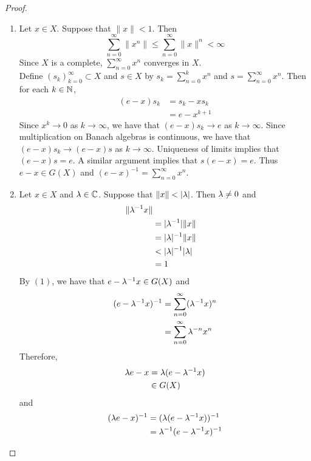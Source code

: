 \documentclass{book}
\begin{document}
\begin{proof}\
	\begin{enumerate}
		\item Let $x \in X$. Suppose that $\|x \|< 1$. Then $$\sum_{n=0}^{\infty} \|x^n \| \leq \sum_{n=0}^{\infty} \|x \|^{n} < \infty$$ Since $X$ is a complete, $\sum\limits_{n=0}^{\infty}x^n$ converges in $X$.\\
		Define $(s_k)_{k=0}^{\infty} \subset X$ and $s \in X$ by $s_k = \sum\limits_{n=0}^{k} x^n$ and  $s = \sum\limits_{n=0}^{\infty}x^n$. Then for each $k \in \mathbb{N}$,
		\begin{align*}
			(e - x) s_k
			& = s_k - x s_k \\
			&= e - x^{k+1} 
		\end{align*}
		Since $x^k \rightarrow 0$ as $k \rightarrow \infty$,  we have that $(e- x)s_k \rightarrow e$ as $k \rightarrow \infty$. Since multiplication on Banach algebras is continuous, we have that $(e - x)s_k \rightarrow (e-x)s$ as $k \rightarrow \infty$. Uniqueness of limits implies that $(e-x)s = e$. A similar argument implies that $s(e-x) = e$. Thus $e - x \in G(X)$ and $(e-x)^{-1} = \sum\limits_{n=0}^{\infty}x^n$. \vspace{.5cm}\\
		\item Let $x \in X$ and $\lambda \in \mathbb{C}$. Suppose that $\|x\| < |\lambda |$. Then $\lambda \neq 0$ and
		\begin{align*}
			\|\lambda^{-1} x\| \\
			& = |\lambda^{-1}| \|x \| \\
			& = |\lambda |^{-1} \|x\| \\
			& < |\lambda |^{-1} |\lambda | \\
			& = 1
		\end{align*}
		By $(1)$, we have that $e - \lambda^{-1}x \in G(X)$ and 
		\begin{align*}
			(e - \lambda^{-1}x)^{-1} 
			& = \sum_{n=0}^{\infty} (\lambda^{-1}x)^n \\
			& = \sum_{n=0}^{\infty} \lambda^{-n} x^n 
		\end{align*}
		Therefore, 
		\begin{align*}
			\lambda e - x
			& = \lambda (e - \lambda^{-1}x) \\
			& \in G(X)
		\end{align*}
		and 
		\begin{align*}
			(\lam e - x)^{-1}
			& = (\lam (e - \lam^{-1}x))^{-1} \\
			& = \lam^{-1}(e - \lam^{-1}x)^{-1} \\

\end{align*}
\end{enumerate}
\end{proof}
\end{document}
